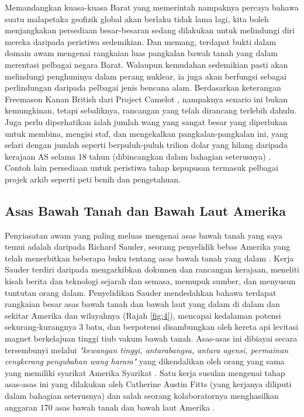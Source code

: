 \documentclass[10pt,twocolumn,letterpaper]{article}
\begin{document}
Memandangkan kuasa-kuasa Barat yang memerintah nampaknya percaya bahawa suatu malapetaka geofizik global akan berlaku tidak lama lagi, kita boleh menjangkakan persediaan besar-besaran sedang dilakukan untuk melindungi diri mereka daripada peristiwa sedemikian. Dan memang, terdapat bukti dalam domain awam mengenai rangkaian luas pangkalan bawah tanah yang dalam merentasi pelbagai negara Barat. Walaupun kemudahan sedemikian pasti akan melindungi penghuninya dalam perang nuklear, ia juga akan berfungsi sebagai perlindungan daripada pelbagai jenis bencana alam. Berdasarkan keterangan Freemason Kanan British dari Project Camelot \cite{4,6}, nampaknya senario ini bukan kemungkinan, tetapi sebaliknya, rancangan yang telah dirancang terlebih dahulu. Juga perlu diperhatikan ialah jumlah wang yang sangat besar yang diperlukan untuk membina, mengisi staf, dan mengekalkan pangkalan-pangkalan ini, yang selari dengan jumlah seperti berpuluh-puluh trilion dolar yang hilang daripada kerajaan AS selama 18 tahun (dibincangkan dalam bahagian seterusnya) \cite{11,12,13}. Contoh lain persediaan untuk peristiwa tahap kepupusan termasuk pelbagai projek arkib seperti peti benih dan pengetahuan.
\subsection{Asas Bawah Tanah dan Bawah Laut Amerika}

Penyiasatan awam yang paling meluas mengenai asas bawah tanah yang saya temui adalah daripada Richard Sauder, seorang penyelidik bebas Amerika yang telah menerbitkan beberapa buku tentang asas bawah tanah yang dalam \cite{22}. Kerja Sauder terdiri daripada mengarkibkan dokumen dan rancangan kerajaan, meneliti kisah berita dan teknologi sejarah dan semasa, memupuk sumber, dan menyusun tuntutan orang dalam. Penyelidikan Sauder mendedahkan bahawa terdapat rangkaian besar asas bawah tanah dan bawah laut yang dalam di dalam dan sekitar Amerika dan wilayahnya (Rajah \ref{fig:4}), mencapai kedalaman potensi sekurang-kurangnya 3 batu, dan berpotensi disambungkan oleh kereta api levitasi magnet berkelajuan tinggi tiub vakum bawah tanah. Asas-asas ini dibiayai secara tersembunyi melalui \textit{"kewangan tinggi, antarabangsa, antara agensi, permainan cengkerang pengubahan wang haram"} yang dikendalikan oleh orang yang sama yang memiliki syarikat Amerika Syarikat \cite{22}. Satu kerja susulan mengenai tahap asas-asas ini yang dilakukan oleh Catherine Austin Fitts (yang kerjanya diliputi dalam bahagian seterusnya) dan salah seorang kolaboratornya menghasilkan anggaran 170 asas bawah tanah dan bawah laut Amerika \cite{16,20}.
\end{document}
